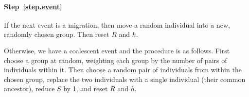 \paragraph{Step~\ref{step.event}} If the next event is a migration,
then move a random individual into a new, randomly chosen group.  Then
reset $R$ and $h$.  

Otherwise, we have a coalescent event and the procedure is as follows.
First choose a group at random, weighting each group by the number of
pairs of individuals within it.  Then choose a random pair of
individuals from within the chosen group, replace the two individuals
with a single individual (their common ancestor), reduce $S$ by 1, and
reset $R$ and $h$.
